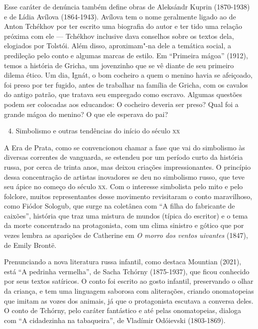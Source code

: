 \documentclass[11pt]{extarticle}
\begin{document}

Esse caráter de denúncia também define obras de Aleksándr Kuprin
(1870-1938) e de Lídia Avílova (1864-1943). Avílova tem o nome
geralmente ligado ao de Anton Tchékhov por ter escrito uma biografia do
autor e ter tido uma relação próxima com ele --- Tchékhov inclusive dava
conselhos sobre os textos dela, elogiados por Tolstói. Além disso,
aproximam"-na dele a temática social, a predileção pelo conto e algumas
marcas de estilo. Em ``Primeira mágoa'' (1912), temos a história
de Gricha, um jovenzinho que se vê diante de seu primeiro dilema ético.
Um dia, Ignát, o bom cocheiro a quem o menino havia se afeiçoado, foi
preso por ter fugido, antes de trabalhar na família de Gricha, com os
cavalos do antigo patrão, que tratava seu empregado como escravo.
Algumas questões podem ser colocadas aos educandos: O cocheiro deveria
ser preso? Qual foi a grande mágoa do menino? O que ele esperava do pai?


\begin{enumerate}
\setcounter{enumi}{3}
\item Simbolismo e outras tendências do início do século \textsc{xx}
\end{enumerate}


A Era de Prata, como se convencionou chamar a fase que vai do
simbolismo às diversas correntes de vanguarda, se estendeu por um
período curto da história russa, por cerca de trinta anos, mas deixou
criações impressionantes. O princípio dessa concentração de artistas
inovadores se deu no simbolismo russo, que teve seu ápice no começo do
século \textsc{xx}. Com o interesse simbolista pelo mito e pelo folclore, muitos
representantes desse movimento revisitaram o conto maravilhoso, como
Fiódor Sologub, que surge na coletânea com ``A filha do fabricante de
caixões'', história que traz uma mistura de mundos (típica do
escritor) e o tema da morte concentrado na protagonista, com um clima
sinistro e gótico que por vezes lembra as aparições de Catherine em
\emph{O morro dos ventos uivantes} (1847), de Emily Brontë.

Prenunciando a nova literatura russa infantil, como destaca Mountian
(2021), está ``A pedrinha vermelha'', de Sacha Tchórny (1875-1937), que
ficou conhecido por seus textos satíricos. O conto foi escrito ao gosto
infantil, preservando o olhar da criança, e tem uma linguagem saborosa
com aliterações, criando onomatopeias que imitam as vozes dos animais, já
que o protagonista escutava a conversa deles. O conto de Tchórny, pelo
caráter fantástico e até pelas onomatopeias, dialoga com ``A cidadezinha
na tabaqueira'', de Vladímir Odóievski (1803-1869).
\end{document}
